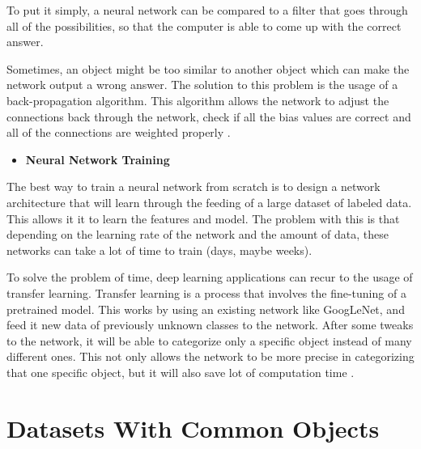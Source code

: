     
   
    \par To put it simply, a neural network can be compared to a filter that goes through all of the possibilities, so that the computer is able to come up with the correct answer.
    \par Sometimes, an object might be too similar to another object which can make the network output a wrong answer. The solution to this problem is the usage of a back-propagation algorithm. This algorithm allows the network to adjust the connections back through the network, check if all the bias values are correct and all of the connections are weighted properly \cite{ArmaanMerchant2018}.
    


        \begin{itemize}
            \item \textbf{Neural Network Training}
        \end{itemize}
    \par The best way to train a neural network from scratch is to design a network architecture that will learn through the feeding of a large dataset of labeled data. This allows it it to learn the features and model. The problem with this is that depending on the learning rate of the network and the amount of data, these networks can take a lot of time to train (days, maybe weeks). 

    \par To solve the problem of time, deep learning applications can recur to the usage of transfer learning. Transfer learning is a process that involves the fine-tuning of a pretrained model. This works by using an existing network like GoogLeNet, and feed it new data of previously unknown classes to the network. After some tweaks to the network, it will be able to categorize only a specific object instead of many different ones. This not only allows the network to be more precise in categorizing that one specific object, but it will also save lot of computation time \cite{mathworks_deeplearning}.


 


    \section{Datasets With Common Objects}

    \label{dataset}

